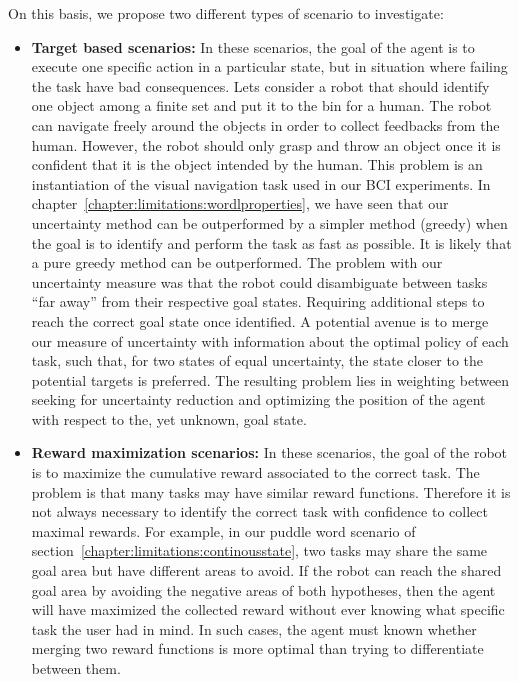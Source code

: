 On this basis, we propose two different types of scenario to investigate: 
\begin{itemize}
\item \textbf{Target based scenarios:} In these scenarios, the goal of the agent is to execute one specific action in a particular state, but in situation where failing the task have bad consequences. 
Lets consider a robot that should identify one object among a finite set and put it to the bin for a human. The robot can navigate freely around the objects in order to collect feedbacks from the human. However, the robot should only grasp and throw an object once it is confident that it is the object intended by the human. 
This problem is an instantiation of the visual navigation task used in our BCI experiments. In chapter~\ref{chapter:limitations:wordlproperties}, we have seen that our uncertainty method can be outperformed by a simpler method (greedy) when the goal is to identify and perform the task as fast as possible. It is likely that a pure greedy method can be outperformed. The problem with our uncertainty measure was that the robot could disambiguate between tasks ``far away'' from their respective goal states. Requiring additional steps to reach the correct goal state once identified. A potential avenue is to merge our measure of uncertainty with information about the optimal policy of each task, such that, for two states of equal uncertainty, the state closer to the potential targets is preferred. The resulting problem lies in weighting between seeking for uncertainty reduction and optimizing the position of the agent with respect to the, yet unknown, goal state.


\item \textbf{Reward maximization scenarios:} In these scenarios, the goal of the robot is to maximize the cumulative reward associated to the correct task. The problem is that many tasks may have similar reward functions. Therefore it is not always necessary to identify the correct task with confidence to collect maximal rewards. For example, in our puddle word scenario of section~\ref{chapter:limitations:continousstate}, two tasks may share the same goal area but have different areas to avoid. If the robot can reach the shared goal area by avoiding the negative areas of both hypotheses, then the agent will have maximized the collected reward without ever knowing what specific task the user had in mind. In such cases, the agent must known whether merging two reward functions is more optimal than trying to differentiate between them.
\end{itemize}
